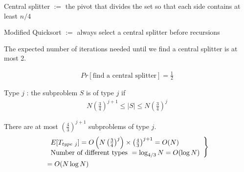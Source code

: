 Central splitter $:=$ the pivot that divides the set so that each side contains at least $n/4$

Modified Quicksort $:=$ always select a central splitter before recursions

\begin{claim}
    The expected number of iterations needed until we find a central splitter is at most 2.
\end{claim} 

\begin{align*}
    Pr[\text{find a central splitter}]=\frac{1}{2}
\end{align*}

Type $j$ : the subproblem $S$ is of type $j$ if
\begin{align*}
    N\left( \frac{3}{4} \right)^{j+1}\le |S|\le N\left( \frac{3}{4} \right)^j
\end{align*}


\begin{claim}
    There are at most $\left( \frac{4}{3} \right)^{j+1}$ subproblems of type $j$.
\begin{align*}
    &\left.\begin{array}[c]{l}
        E[T_{type\ j}]=O\left( N\left( \frac{3}{4} \right)^j \right)\times \left( \frac{4}{3} \right)^{j+1}=O(N)\\
        \text{Number of different types }=\log_{4/3}N=O(\log N)
    \end{array}\right\}\\
    &=O(N\log N)
\end{align*}
\end{claim} 
